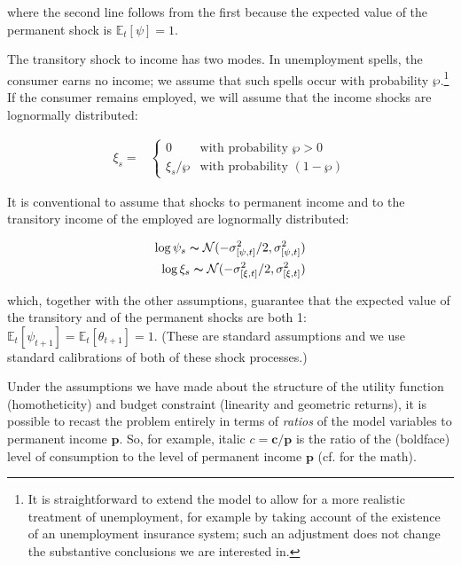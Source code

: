 \documentclass{article}
\newcommand{\pLvl}{\mathbf{p}}
\newcommand{\cLvl}{\mathbf{c}}
\newcommand{\Ex}{\mathbb{E}}
\newcommand{\permShk}{\psi}
\newcommand{\pZero}{\wp}
\newcommand{\tranShkEmp}{\xi}
\newcommand{\tranShk}{\theta}
\newcommand{\cNrm}{c}
\begin{document}
where the second line follows from the first because the expected value of the permanent shock is $\Ex_{t}[\permShk]=1$.

The transitory shock to income has two modes. In unemployment spells, the consumer earns no income; we assume that such spells occur with probability $\pZero$.\footnote{It is straightforward to extend the model to allow for a more realistic treatment of unemployment, for example by taking account of the existence of an unemployment insurance system; such an adjustment does not change the substantive conclusions we are interested in.} If the consumer remains employed, we will assume that the income shocks are lognormally distributed:

\begin{equation}
\begin{align}
    \tranShkEmp_{s} = &
    \begin{cases}
        0\phantom{/\pZero} & \text{with probability $\pZero>0$}
        \\ \xi_{s}/\pZero & \text{with probability $(1-\pZero)$}
    \end{cases}
\end{align}
\end{equation}

It is conventional to assume that shocks to permanent income and to the transitory income of the employed are lognormally distributed:

\begin{equation}
\begin{align}
    \log \permShk_{s} \thicksim \mathcal{N}(-\sigma_{[\permShk, t]}^{2}/2,\sigma_{[\permShk, t]}^{2})
    \\ \log \xi_{s}\thicksim \mathcal{N}(-\sigma_{[\xi, t]}^{2}/2,\sigma_{[\xi, t]}^{2})
\end{align}
\end{equation}

which, together with the other assumptions, guarantee that the expected value of the transitory and of the permanent shocks are both 1: $\Ex_{t}[\permShk_{t+1}]=\Ex_{t}[\tranShk_{t+1}]=1$. (These are standard assumptions and we use standard calibrations of both of these shock processes.)

Under the assumptions we have made about the structure of the utility function (homotheticity) and budget constraint (linearity and geometric returns), it is possible to recast the problem entirely in terms of \textit{ratios} of the model variables to permanent income $\pLvl$. So, for example, italic $\cNrm = \cLvl/\pLvl$ is the ratio of the (boldface) level of consumption to the level of permanent income $\pLvl$ (cf. \cite{Carroll_2004} for the math).
\end{document}
